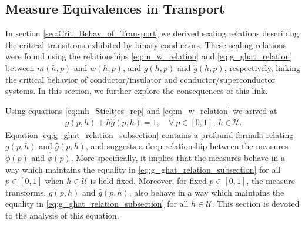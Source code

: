 \documentclass[english,12pt,jmp,graphicx]{revtex4-1}
\newcommand{\ph}{\hat{\phi}}
\begin{document}
\subsection{Measure Equivalences in Transport} \label{sec:Measure_Equiv}
%
In section \ref{sec:Crit_Behav_of_Transport} we derived scaling
relations describing the critical transitions exhibited by binary
conductors. These scaling relations were found using the
relationships \eqref{eq:m_w_relation} and \eqref{eq:g_ghat_relation}
between $m(h,p)$ and $w(h,p)$, and $g(h,p)$ and $\hat{g}(h,p)$,
respectively, linking the critical behavior of conductor/insulator and
conductor/superconductor systems. In this section, we further explore
the consequences of this link. 

Using equations \eqref{eq:mh_Stieltjes_rep} and
\eqref{eq:m_w_relation} we arived at 
%
\begin{align}\label{eq:g_ghat_relation_subsection}
  g(p,h)+h\hat{g}(p,h)=1, \quad \forall \ p\in[0,1], \ h\in\mathcal{U}.
\end{align}
%
Equation \eqref{eq:g_ghat_relation_subsection} contains a profound formula
relating $g(p,h)$ and $\hat{g}(p,h)$, and suggests a deep relationship
between the measures $\phi(p)$ and $\ph(p)$. More specifically, it
implies that the measures behave in a way which maintains the equality
in \eqref{eq:g_ghat_relation_subsection} for all $p\in[0,1]$ when $h\in\mathcal{U}$
is held fixed. Moreover, for fixed $p\in[0,1]$, the measure transforms,
$g(p,h)$ and $\hat{g}(p,h)$, also behave in a way which maintains the
equality in \eqref{eq:g_ghat_relation_subsection} for all $h\in\mathcal{U}$. This
section is devoted to the analysis of this equation. 
\end{document}
